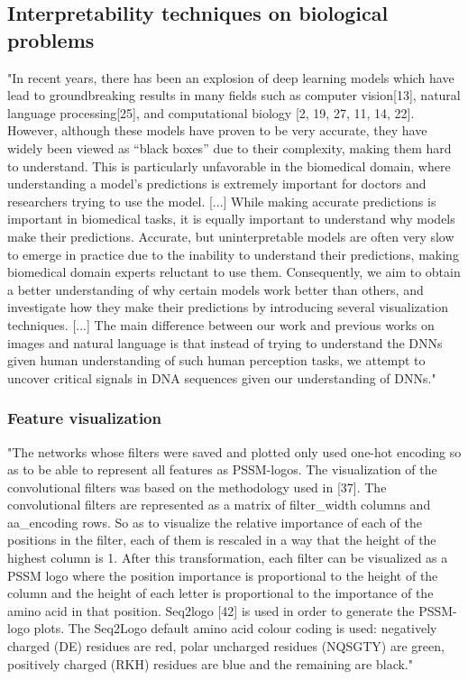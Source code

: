 	\subsection{Interpretability techniques on biological problems}
	"In recent years, there has been an explosion of deep learning models which have lead to groundbreaking results in many fields such as computer vision[13], natural language processing[25], and computational biology [2, 19, 27, 11, 14, 22]. However, although these models have proven to be very accurate, they have widely been viewed as “black boxes” due to their complexity, making them hard to understand. This is particularly unfavorable in the biomedical domain, where understanding a model’s predictions is extremely important for doctors and researchers trying to use the model.
	 [...]
	While making accurate predictions is important in biomedical tasks, it is equally important to understand why models make their predictions. Accurate, but uninterpretable models are often very slow to emerge in practice due to the inability to understand their predictions, making biomedical domain experts reluctant to use them. Consequently, we aim to obtain a better understanding of why certain models work better than others, and investigate how they make their predictions by introducing several visualization techniques.
	[...]
	The main difference between our work and previous works on images and natural language is that instead of trying to understand the DNNs given human understanding of such human perception tasks, we attempt to uncover critical signals in DNA sequences given our understanding of DNNs." \cite{Lanchantin2016}
	

		\subsubsection{Feature visualization}
		"The networks whose filters were saved and plotted only used one-hot encoding so as to be able to represent all features as PSSM-logos. The visualization of the convolutional filters was based on the methodology used in [37]. The convolutional filters are represented as a matrix of filter\_width columns and aa\_encoding rows. So as to visualize the relative importance of each of the positions in the filter, each of them is rescaled in a way that the height of the highest column is 1. After this transformation, each filter can be visualized as a PSSM logo where the position importance is proportional to the height of the column and the height of each letter is proportional to the importance of the amino acid in that position. Seq2logo [42] is used in order to generate the PSSM-logo plots. The Seq2Logo default amino acid colour coding is used: negatively charged (DE) residues are red, polar uncharged residues (NQSGTY) are green, positively charged (RKH) residues are blue and the remaining are black." \cite{Fontal2017}

